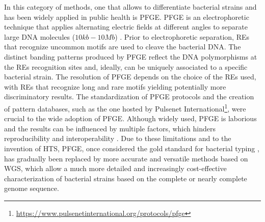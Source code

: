 In this category of methods, one that allows to differentiate bacterial strains and has been widely applied in public health is \ac{PFGE}. \ac{PFGE} is an electrophoretic technique that applies alternating electric fields at different angles to separate large \ac{DNA} molecules ($10kb-10Mb$) \cite{schwartz_separation_1984, herschleb_pulsed-field_2007, lopez-canovas_pulsed_2019}. Prior to electrophoretic separation, \acs{RE}s that recognize uncommon motifs are used to cleave the bacterial \ac{DNA}. The distinct banding patterns produced by \ac{PFGE} reflect the \ac{DNA} polymorphisms at the \acs{RE}s recognition sites and, ideally, can be uniquely associated to a specific bacterial strain. The resolution of \ac{PFGE} depends on the choice of the \acs{RE}s used, with \acs{RE}s that recognize long and rare motifs yielding potentially more discriminatory results. The standardization of \ac{PFGE} protocols and the creation of pattern databases, such as the one hosted by Pulsenet International\footnote{\url{https://www.pulsenetinternational.org/protocols/pfge}}, were crucial to the wide adoption of \ac{PFGE}. Although widely used, \ac{PFGE} is laborious and the results can be influenced by multiple factors, which hinders reproducibility and interoperability \cite{li_bacterial_2009}. Due to these limitations and to the invention of \ac{HTS}, \ac{PFGE}, once considered the gold standard for bacterial typing \cite{neoh_pulsed-field_2019}, has gradually been replaced by more accurate and versatile methods based on \ac{WGS}, which allow a much more detailed and increasingly cost-effective characterization of bacterial strains based on the complete or nearly complete genome sequence.

